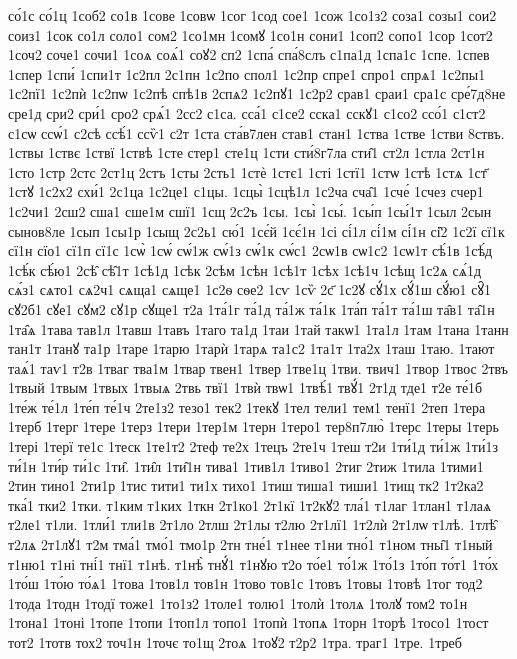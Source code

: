 {со́1с
со́1ц
1соб2
со1в
1сове
1совѡ
1сог
1сод
сое1
1сож
1со1з2
соза1
созы1
сои2
соиз1
1сок
со1л
соло1
сом2
1со1мн
1сомꙋ
1со1н
сони1
1соп2
сопо1
1сор
1сот2
1соч2
соче1
сочи1
1соѧ
соѧ́1
соꙋ2
сп2
1спа́
спа́8слъ
с1па1д
1спа1с
1спе.
1спев
1спер
1спи́
1спи1т
1с2пл
2с1пн
1с2по
спол1
1с2пр
спре1
спро1
спрѧ1
1с2пы1
1с2пї1
1с2пѝ
1с2пѡ
1с2пѣ
спѣ1в
2спѧ2
1с2пꙋ1
1с2р2
срав1
сраи1
сра1с
сре́7д8не
сре1д
сри2
сри́1
сро2
срѧ́1
2сс2
с1са.
сса́1
с1се2
сска1
сскꙋ1
с1со2
ссо́1
с1ст2
с1сѡ
ссѡ́1
с2сѣ
ссѣ́1
ссѷ1
с2т
1ста
ста́в7лен
став1
стан1
1ства
1стве
1стви
8ствъ.
1ствы
1ствє
1ствї
1ствѣ
1сте
стер1
сте1ц
1сти
сти́8г7ла
сти̑1
ст2л
1стла
2ст1н
1сто
1стр
2стс
2ст1ц
2стъ
1сты
2сть1
1стѐ
1стє1
1сті
1стї1
1стѡ
1стѣ
1стѧ
1ст҃
1стꙋ
1с2х2
схи́1
2с1ца
1с2це1
с1цы.
1сцы̀
1сцѣ1л
1с2ча
сча̑1
1сче́
1счез
счер1
1с2чи1
2сш2
сша1
сше1м
сшї1
1сщ
2с2ъ
1сы.
1сы̀
1сы́.
1сы́п
1сы́1т
1сыл
2сын
сынов8ле
1сып
1сы1р
1сыщ
2с2ь1
сю́1
1сє́й
1сє́1н
1сі
сі́1л
сі́1м
сі́1н
сі̑2
1с2ї
сї1к
сї1н
сїо1
сї1п
сї1с
1сѡ̀
1сѡ́
сѡ́1ж
сѡ́1з
сѡ́1к
сѡ́с1
2сѡ1в
сѡ1с2
1сѡ1т
сѣ́1в
1сѣ́д
1сѣ́к
сѣ́ю1
2сѣ̑
сѣ̑1т
1сѣ1д
1сѣк
2сѣм
1сѣн
1сѣ1т
1сѣх
1сѣ1ч
1сѣщ
1с2ѧ
сѧ́1д
сѧ́з1
сѧто1
сѧ2ч1
сѧща1
сѧще1
1с2ѳ
сѳе2
1сѵ
1сѷ
2с҃
1с2ꙋ
сꙋ́1х
сꙋ́1ш
сꙋ́ю1
сꙋ̑1
сꙋ2б1
сꙋе1
сꙋм2
сꙋ1р
сꙋще1
т2а
1та́1г
та́1д
та́1ж
та́1к
1та́п
та́1т
та́1ш
та̑в1
та̑1н
1та̑ѧ
1тава
тав1л
1тавш
1тавъ
1таго
та1д
1таи
1тай
такѡ1
1та1л
1там
1тана
1танн
тан1т
1танꙋ
та1р
1таре
1тарю
1тарѝ
1тарѧ
та1с2
1та1т
1та2х
1таш
1таю.
1тают
таѧ́1
таѵ1
т2в
1тваг
тва1м
1твар
твен1
1твер
1тве1ц
1тви.
твич1
1твор
1твос
2твъ
1твый
1твым
1твых
1твыѧ
2твь
твї1
1твѝ
твѡ1
1твѣ́1
твꙋ́1
2т1д
тде1
т2е
те́1б
1те́ж
те́1л
1те́п
те́1ч
2те1з2
тезо1
тек2
1текꙋ
1тел
тели1
тем1
тенї1
2теп
1тера
1терб
1терг
1тере
1терз
1тери
1тер1м
1терн
1теро1
тер8п7лю̀
1терс
1теры
1терь
1тері
1терї
те1с
1теск
1те1т2
2теф
те2х
1тецъ
2те1ч
1теш
т2и
1ти́1д
ти́1ж
1ти́1з
ти́1н
1ти́р
ти́1с
1ти̑.
1ти̑л
1ти̑1н
тива1
1тив1л
1тиво1
2тиг
2тиж
1тила
1тими1
2тин
тино1
2ти1р
1тис
тити1
ти1х
тихо1
1тиш
тиша1
тиши1
1тищ
тк2
1т2ка2
тка́1
тки2
1тки.
т1ким
т1ких
1ткн
2т1ко1
2т1кї
1т2кꙋ2
тла́1
т1лаг
1тлан1
т1лаѧ
т2ле1
т1ли.
1тли́1
тли1в
2т1ло
2тлш
2т1лы
т2лю
2т1лї1
1т2лѝ
2т1лѡ
т1лѣ.
1тлѣ̑
т2лѧ
2т1лꙋ1
т2м
тма́1
тмо́1
тмо1р
2тн
тне́1
т1нее
т1ни
тно́1
т1ном
тны̑1
т1ный
т1ню1
т1ні
тні́1
тнї1
т1нѣ.
т1нѣ̀
тнꙋ́1
т1нꙋю
т2о
то́е1
то́1ж
1то́1з
1то́п
то́т1
1то́х
1то́ш
1то́ю
то́ѧ1
1това
1тов1л
тов1н
1тово
тов1с
1товъ
1товы
1товѣ
1тог
тод2
1тода
1тодн
1тодї
тоже1
1то1з2
1толе1
толю1
1толѝ
1толѧ
1толꙋ
том2
то1н
1тона1
1тоні
1топе
1топи
1топ1л
топо1
1топѝ
1топѧ
1торн
1торѣ
1тосо1
1тост
тот2
1тотв
тох2
точ1н
1точє
то1щ
2тоѧ
1тоꙋ2
т2р2
1тра.
траг1
1тре.
1треб
}
